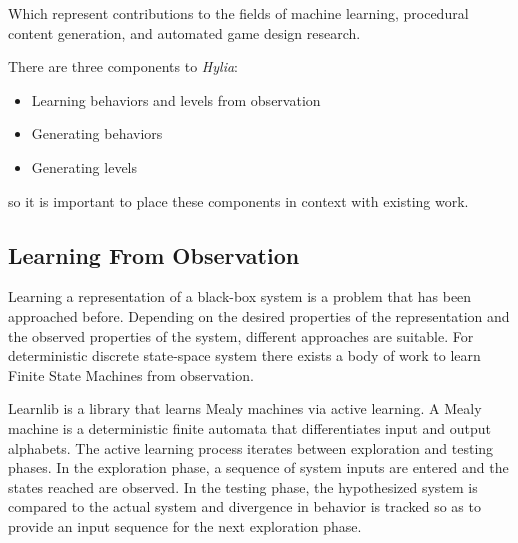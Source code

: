 \documentclass[a4paper]{article}
\begin{document}
Which represent contributions to the fields of machine learning, procedural content generation, and automated game design research.


There are three components to \textit{Hylia}:

\begin{itemize}
\item Learning behaviors and levels from observation
\item Generating behaviors
\item Generating levels
\end{itemize}

so it is important to place these components in context with existing work.



\subsection{Learning From Observation}

Learning a representation of a black-box system is a problem that has been approached before.  Depending on the desired properties of the representation and the observed properties of the system, different approaches are suitable.  For deterministic discrete state-space system there exists a body of work to learn Finite State Machines from observation.  

Learnlib \cite{Introduction to Active Automata Learning from
a Practical Perspective?} is a library that learns Mealy machines via active learning.  A Mealy machine is a deterministic finite automata that differentiates input and output alphabets. The active learning process iterates between exploration and testing phases.  In the exploration phase, a sequence of system inputs are entered and the states reached are observed.  In the testing phase, the hypothesized system is compared to the actual system and divergence in behavior is tracked so as to provide an input sequence for the next exploration phase.
\end{document}
